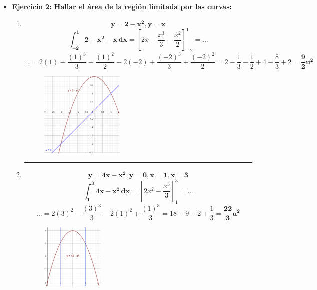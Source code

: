 \documentclass[12pt]{article}
\begin{document}
\begin{itemize}
        \newpage
        \item \textbf{Ejercicio 2: Hallar el área de la región limitada por las curvas:}\vspace{0.5cm}
            \begin{enumerate}
                \hrule
                \item \[\bm{y = 2 - x^2, y = x}\]
                    \[\bm{\int_{-2}^{1} 2 - x^2 - x \, dx} = \left[2x - \frac{x^3}{3} - \frac{x^2}{2}\right]_{-2}^{1} = ...\]
                    \[... = 2(1) - \frac{(1)^3}{3} - \frac{(1)^2}{2} - 2(-2) + \frac{(-2)^3}{3} + \frac{(-2)^2}{2} = 2 -\frac{1}{3} - \frac{1}{2} + 4 - \frac{8}{3} + 2 = \bm{\frac{9}{2}u^2}\]
                    \begin{figure}[h!]
                        \centering
                        \includegraphics[width=0.4\textwidth]{img/t6-ej2-1.png}
                    \end{figure}
            
                \hrule
                \item \[\bm{y = 4x - x^2, y = 0, x = 1, x = 3}\]
                    \[\bm{\int_{1}^{3} 4x - x^2 \, dx} = \left[2x^2 - \frac{x^3}{3}\right]_{1}^{3} = ...\]
                    \[... = 2(3)^2 - \frac{(3)^3}{3} - 2(1)^2 + \frac{(1)^3}{3} = 18 - 9 - 2 +\frac{1}{3} = \bm{\frac{22}{3}u^2}\]
                    \begin{figure}[h!]
                        \centering
                        \includegraphics[width=0.3\textwidth]{img/t6-ej2-2.png}
                    \end{figure}



\end{enumerate}
\end{itemize}
\end{document}
